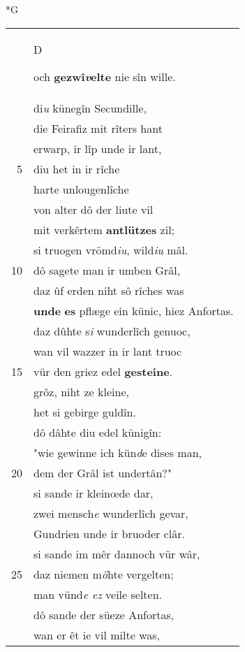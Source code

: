 \documentclass[8pt,a4paper,notitlepage]{article}
\begin{document}
\begin{table}[ht]
\begin{minipage}[t]{0.5\linewidth}
\small
\begin{center}*G
\end{center}
\begin{tabular}{rl}
 & \begin{large}D\end{large}och \textbf{gezwî\textit{v}elte} nie sîn wille.\\ 
 & di\textit{u} künegîn Secundille,\\ 
 & die Feirafiz mit rîters hant\\ 
 & erwarp, ir lîp unde ir lant,\\ 
5 & diu het in ir rîche\\ 
 & harte unlougenlîche\\ 
 & von alter dô der liute vil\\ 
 & mit verkêrtem \textbf{antlützes} zil;\\ 
 & si truogen vrömd\textit{iu}, wild\textit{iu} mâl.\\ 
10 & dô sagete man ir umben Grâl,\\ 
 & daz ûf erden niht sô rîches was\\ 
 & \textbf{unde} \textbf{es} pflæge ein künic, hiez Anfortas.\\ 
 & daz dûhte s\textit{i} wunderlîch genuoc,\\ 
 & wan vil wazzer in ir lant truoc\\ 
15 & vür den griez edel \textbf{gesteine}.\\ 
 & grôz, niht ze kleine,\\ 
 & het si gebirge guldîn.\\ 
 & dô dâhte diu edel künigîn:\\ 
 & "wie gewinne ich kün\textit{d}e dises man,\\ 
20 & dem der Grâl ist undertân?"\\ 
 & si sande ir kleinœde dar,\\ 
 & zwei mensch\textit{e} wunderlîch gevar,\\ 
 & Gundrien unde ir bruoder clâr.\\ 
 & si sande im mêr dannoch vür wâr,\\ 
25 & daz niemen m\textit{ö}hte vergelten;\\ 
 & man vünd\textit{e ez} veile selten.\\ 
 & dô sande der süeze Anfortas,\\ 
 & wan er êt ie vil milte was,\\ 

\end{tabular}
\end{minipage}
\end{table}
\end{document}
